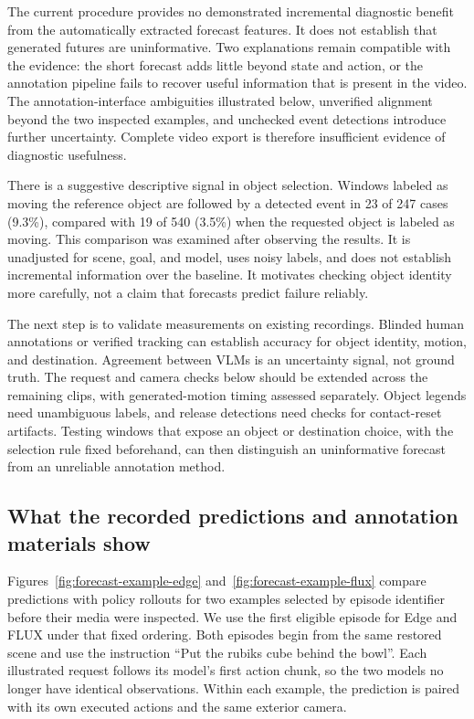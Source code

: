 \documentclass{article}
\begin{document}
The current procedure provides no demonstrated incremental diagnostic benefit from the automatically extracted forecast features. It does not establish that generated futures are uninformative. Two explanations remain compatible with the evidence: the short forecast adds little beyond state and action, or the annotation pipeline fails to recover useful information that is present in the video. The annotation-interface ambiguities illustrated below, unverified alignment beyond the two inspected examples, and unchecked event detections introduce further uncertainty. Complete video export is therefore insufficient evidence of diagnostic usefulness.

There is a suggestive descriptive signal in object selection. Windows labeled as moving the reference object are followed by a detected event in 23 of 247 cases (9.3\%), compared with 19 of 540 (3.5\%) when the requested object is labeled as moving. This comparison was examined after observing the results. It is unadjusted for scene, goal, and model, uses noisy labels, and does not establish incremental information over the baseline. It motivates checking object identity more carefully, not a claim that forecasts predict failure reliably.

The next step is to validate measurements on existing recordings. Blinded human annotations or verified tracking can establish accuracy for object identity, motion, and destination. Agreement between VLMs is an uncertainty signal, not ground truth. The request and camera checks below should be extended across the remaining clips, with generated-motion timing assessed separately. Object legends need unambiguous labels, and release detections need checks for contact-reset artifacts. Testing windows that expose an object or destination choice, with the selection rule fixed beforehand, can then distinguish an uninformative forecast from an unreliable annotation method.


\clearpage
\subsection{What the recorded predictions and annotation materials show}
\label{app:forecast-examples}

Figures~\ref{fig:forecast-example-edge} and~\ref{fig:forecast-example-flux} compare predictions with policy rollouts for two examples selected by episode identifier before their media were inspected. We use the first eligible episode for Edge and FLUX under that fixed ordering. Both episodes begin from the same restored scene and use the instruction ``Put the rubiks cube behind the bowl''. Each illustrated request follows its model's first action chunk, so the two models no longer have identical observations. Within each example, the prediction is paired with its own executed actions and the same exterior camera.
\end{document}
